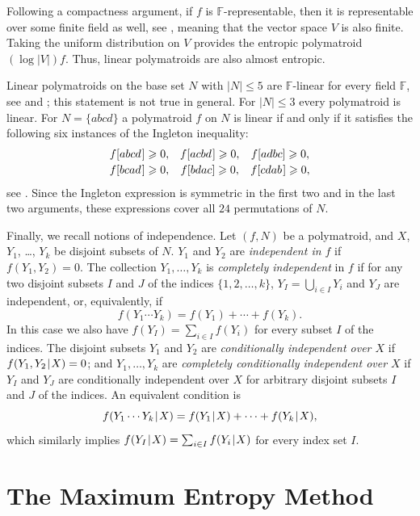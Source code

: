 \documentclass[reqno]{amsart}
\theoremstyle{definition}
\newcommand\tsp{\mkern 1.5mu}
\def\|{\mkern1.5mu{|}\mkern1.5mu}
\renewcommand\ge{\geqslant}\renewcommand\le{\leqslant}
\def\abcd{[abcd\tsp]}
\def\acbd{[acbd\tsp]}
\def\cdab{[cdab\tsp]}
\begin{document}
Following a compactness argument, if $f$ is $\mathbb F$-representable, then
it is representable over some finite field as well, see \cite{jbell},
meaning that the vector space $V$ is also finite. Taking the uniform
distribution on $V$ provides the entropic polymatroid $(\log |V|)f$. Thus,
linear polymatroids are also almost entropic.

Linear polymatroids on the base set $N$ with $|N|\le 5$ are $\mathbb
F$-linear for every field $\mathbb F$, see \cite{Ma.Stud} and \cite{DFZ10};
this statement is not true in general. For
$|N|\le3$ every polymatroid is linear. For $N=\{abcd\}$ a polymatroid $f$ on
$N$ is linear if and only if it satisfies the following six instances of the
Ingleton inequality:
$$\begin{array}{ccc}
   f\abcd\ge 0, & f\acbd\ge 0, & f[adbc]\ge 0, \\[2pt]
   f[bcad\tsp]\ge 0, & f[bdac]\ge 0,     & f\cdab\ge 0,
\end{array}$$
see \cite{Ma.Stud}.
Since the Ingleton expression is symmetric in the first two and in the
last two arguments, these expressions cover all $24$ permutations of
$N$.

\smallskip
Finally, we recall notions of independence. Let $(f,N)$ be a polymatroid,
and $X$, $Y_1$, \dots, $Y_k$ be disjoint subsets of $N$. $Y_1$ and $Y_2$ are
\emph{independent in $f$} if $f(Y_1,Y_2)=0$. The collection $Y_1,\dots,Y_k$
is \emph{completely independent} in $f$ if for any two disjoint subsets $I$
and $J$ of the indices $\{1,2,\dots,k\}$, $Y_I=\bigcup_{i\in I}Y_i$ and
$Y_J$ are independent, or, equivalently, if
$$ 
   f(Y_1\cdots Y_k) = f(Y_1)+\cdots +f(Y_k).
$$
In this case we also have $f(Y_I)=\sum_{i\in I} f(Y_i)$ for every subset $I$
of the indices. The disjoint subsets $Y_1$ and $Y_2$ are \emph{conditionally
independent over $X$} if $f(Y_1,Y_2 \|X)=0$; and $Y_1,\dots,Y_k$ are
\emph{completely conditionally independent over $X$} if $Y_I$ and $Y_J$ are
conditionally independent over $X$ for arbitrary disjoint subsets $I$ and
$J$ of the indices. An equivalent condition is
$$
   f(Y_1\cdots Y_k\|X) = f(Y_1\|X)+ \cdots + f(Y_k\|X),
$$
which similarly implies $f(Y_I\|X)=\sum_{i\in I} f(Y_i\|X)$ for every
index set $I$.


\section{The Maximum Entropy Method}\label{sec:method}
\end{document}
